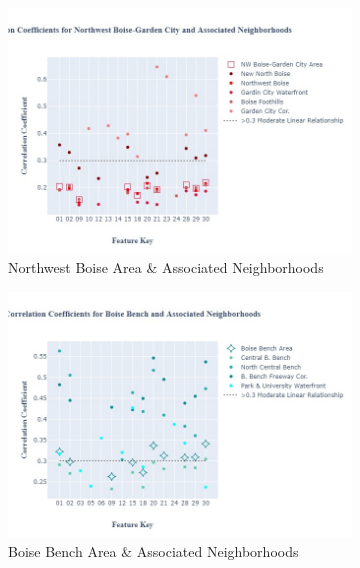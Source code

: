 \documentclass{article}
\begin{document}
\begin{figure}[H]
     \centering
     \begin{subfigure}[b]{0.45\textwidth}
         \centering
         \includegraphics[width=\textwidth]{images/NW_fig.jpg}
         \caption{Northwest Boise Area \& Associated Neighborhoods}
         \label{fig: nw_cc}
     \end{subfigure}
     \begin{subfigure}[b]{0.45\textwidth}
         \centering
         \includegraphics[width=\textwidth]{images/BB_fig.jpg}
         \caption{Boise Bench Area \& Associated Neighborhoods}
         \label{fig: bb_cc}
     \end{subfigure}
          \begin{subfigure}[b]{0.45\textwidth}
         \centering

\end{subfigure}
\end{figure}
\end{document}
